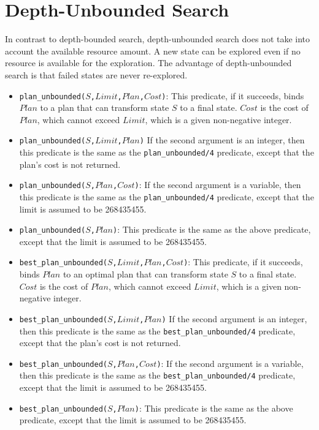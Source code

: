 \section{Depth-Unbounded Search}
In contrast to depth-bounded search, depth-unbounded search does not take into account the available resource amount. A new state can be explored even if no resource is available for the exploration. The advantage of depth-unbounded search is that failed states are never re-explored.

\begin{itemize}
\item \texttt{plan\_unbounded($S$,$Limit$,$Plan$,$Cost$)}: This predicate, if it succeeds, binds $Plan$ to a plan that can transform state $S$ to a final state. $Cost$ is the cost of $Plan$, which cannot exceed $Limit$, which is a given non-negative integer.

\item \texttt{plan\_unbounded($S$,$Limit$,$Plan$)} If the second argument is an integer, then this predicate is the same as the \texttt{plan\_unbounded/4} predicate, except that the plan's cost is not returned. 

\item \texttt{plan\_unbounded($S$,$Plan$,$Cost$)}: If the second argument is a variable, then this predicate is the same as the \texttt{plan\_unbounded/4} predicate, except that the limit is assumed to be 268435455.

\item \texttt{plan\_unbounded($S$,$Plan$)}: This predicate is the same as the above predicate, except that the limit is assumed to be 268435455.

\item \texttt{best\_plan\_unbounded($S$,$Limit$,$Plan$,$Cost$)}: This predicate, if it succeeds, binds $Plan$ to an optimal plan that can transform state $S$ to a final state. $Cost$ is the cost of $Plan$, which cannot exceed $Limit$, which is a given non-negative integer.

\item \texttt{best\_plan\_unbounded($S$,$Limit$,$Plan$)} If the second argument is an integer, then this predicate is the same as the \texttt{best\_plan\_unbounded/4} predicate, except that the plan's cost is not returned.

\item \texttt{best\_plan\_unbounded($S$,$Plan$,$Cost$)}: If the second argument is a variable, then this predicate is the same as the \texttt{best\_plan\_unbounded/4} predicate, except that the limit is assumed to be 268435455.

\item \texttt{best\_plan\_unbounded($S$,$Plan$)}: This predicate is the same as the above predicate, except that the limit is assumed to be 268435455.
\end{itemize}

